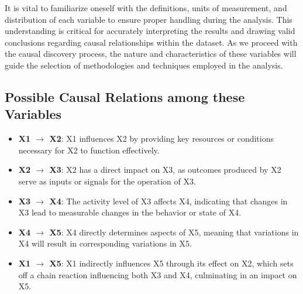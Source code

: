 \documentclass{article}
\begin{document}
It is vital to familiarize oneself with the definitions, units of measurement, and distribution of each variable to ensure proper handling during the analysis. This understanding is critical for accurately interpreting the results and drawing valid conclusions regarding causal relationships within the dataset. As we proceed with the causal discovery process, the nature and characteristics of these variables will guide the selection of methodologies and techniques employed in the analysis.

\subsection{Possible Causal Relations among these Variables}

\begin{minipage}[t]{0.7\linewidth}
\begin{itemize}
\item \textbf{X1 $\rightarrow$ X2}: X1 influences X2 by providing key resources or conditions necessary for X2 to function effectively.
\item \textbf{X2 $\rightarrow$ X3}: X2 has a direct impact on X3, as outcomes produced by X2 serve as inputs or signals for the operation of X3.
\item \textbf{X3 $\rightarrow$ X4}: The activity level of X3 affects X4, indicating that changes in X3 lead to measurable changes in the behavior or state of X4.
\item \textbf{X4 $\rightarrow$ X5}: X4 directly determines aspects of X5, meaning that variations in X4 will result in corresponding variations in X5.
\item \textbf{X1 $\rightarrow$ X5}: X1 indirectly influences X5 through its effect on X2, which sets off a chain reaction influencing both X3 and X4, culminating in an impact on X5.
\end{itemize}
\end{minipage}
\hspace{0.05\textwidth}
\end{document}
